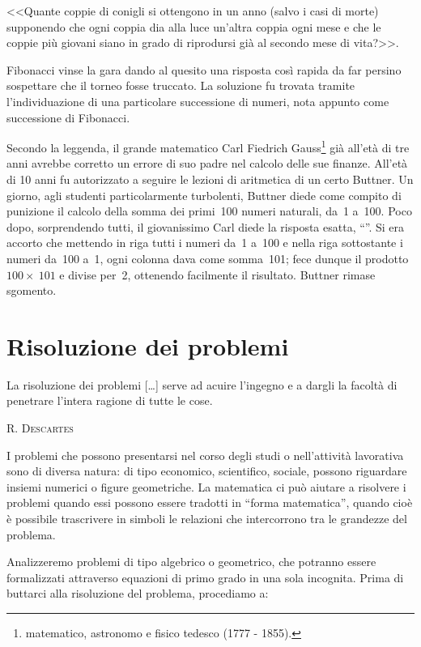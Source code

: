 <<Quante coppie di conigli si ottengono in un anno (salvo i
casi di morte) supponendo che ogni coppia dia alla luce
un'altra coppia ogni mese e che le coppie più
giovani siano in grado di riprodursi già al secondo mese di
vita?>>.

Fibonacci vinse la gara dando al quesito una risposta così rapida da
far persino sospettare che il torneo fosse truccato. La soluzione fu
trovata tramite l'individuazione di una particolare
successione di numeri, nota appunto come successione di Fibonacci.

Secondo la leggenda, il grande matematico Carl Fiedrich Gauss\footnote{matematico, astronomo e fisico tedesco (1777 - 1855).} già
all'età di tre anni avrebbe corretto un errore di
suo padre nel calcolo delle sue finanze. All'età di
10 anni fu autorizzato a seguire le lezioni di aritmetica di un certo
Buttner. Un giorno, agli studenti particolarmente turbolenti, Buttner
diede come compito di punizione il calcolo della somma dei primi~100
numeri naturali, da~1 a~100. Poco dopo, sorprendendo tutti, il giovanissimo Carl
diede la risposta esatta, ``''.
Si era accorto che mettendo in riga tutti i numeri da~1 a~100 e nella
riga sottostante i numeri da~100 a~1, ogni colonna dava come somma~101;
fece dunque il prodotto~$100\times~101$ e divise per~2, ottenendo facilmente il
risultato. Buttner rimase sgomento.

\section{Risoluzione dei problemi}

 \epigraph{La risoluzione dei problemi [\ldots] serve ad acuire
 l'ingegno e a dargli la facoltà di penetrare
 l'intera ragione di tutte le cose.}{{\scshape{R. Descartes}}}

I problemi che possono presentarsi nel corso degli studi o
nell'attività lavorativa sono di diversa natura: di
tipo economico, scientifico, sociale, possono riguardare insiemi
numerici o figure geometriche. La matematica ci può aiutare a
risolvere i problemi quando essi possono essere tradotti in
``forma matematica'', quando cioè
è possibile trascrivere in simboli le relazioni che intercorrono
tra le grandezze del problema.

Analizzeremo problemi di tipo algebrico o geometrico, che potranno
essere formalizzati attraverso equazioni di primo grado in una sola
incognita. Prima di buttarci alla risoluzione del problema, procediamo
a:

